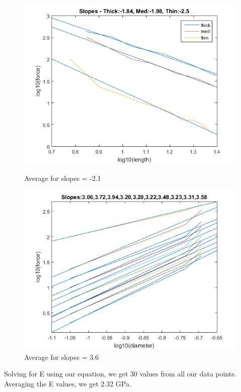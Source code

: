 \documentclass{article}
\begin{document}
\begin{figure}[h]
	\begin{minipage}{0.5\textwidth}
		\centering
		\includegraphics[scale=0.3]{Lab1f1.png}
		\caption{Average for slopes = -2.1}
	\end{minipage}%
	\begin{minipage}{0.5\textwidth}
		\centering
		\includegraphics[scale=0.3]{Lab1f3.png}
		\caption{Average for slopes = 3.6}
	\end{minipage}
\end{figure}

Solving for E using our equation, we get 30 values from all our data points. Averaging the E values, we get 2.32 GPa.
\end{document}
